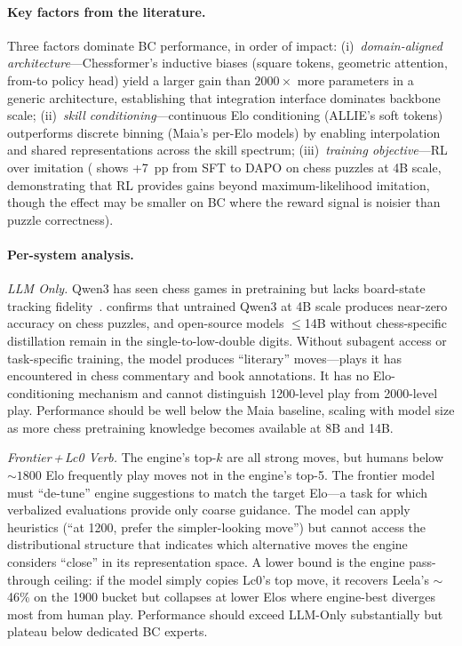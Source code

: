 \paragraph{Key factors from the literature.}
Three factors dominate BC performance, in order of impact:
(i)~\emph{domain-aligned architecture}---Chessformer's inductive biases
(square tokens, geometric attention, from-to policy head) yield a larger
gain than $2000{\times}$ more parameters in a generic architecture,
establishing that integration interface dominates backbone scale;
(ii)~\emph{skill conditioning}---continuous Elo conditioning (ALLIE's soft
tokens) outperforms discrete binning (Maia's per-Elo models) by enabling
interpolation and shared representations across the skill spectrum;
(iii)~\emph{training objective}---RL over imitation
(\cite{XXX_c1} shows +7~pp from SFT to DAPO on chess puzzles at 4B scale,
demonstrating that RL provides gains beyond maximum-likelihood imitation,
though the effect may be smaller on BC where the reward signal is noisier
than puzzle correctness).

\paragraph{Per-system analysis.}

\emph{LLM Only.}
Qwen3 has seen chess games in pretraining but lacks board-state tracking
fidelity~\cite{XXX_chessqa}.
\cite{XXX_c1} confirms that untrained Qwen3 at 4B scale produces near-zero
accuracy on chess puzzles, and open-source models ${\leq}$14B without
chess-specific distillation remain in the single-to-low-double digits.
Without subagent access or task-specific training, the model produces
``literary'' moves---plays it has encountered in chess commentary and
book annotations.
It has no Elo-conditioning mechanism and cannot distinguish 1200-level play
from 2000-level play.
Performance should be well below the Maia baseline, scaling with model size
as more chess pretraining knowledge becomes available at 8B and 14B.

\emph{Frontier\,+\,Lc0 Verb.}
The engine's top-$k$ are all strong moves, but humans below ${\sim}1800$ Elo
frequently play moves not in the engine's top-5.
The frontier model must ``de-tune'' engine suggestions to match the target
Elo---a task for which verbalized evaluations provide only coarse guidance.
The model can apply heuristics (``at 1200, prefer the simpler-looking
move'') but cannot access the distributional structure that indicates which
alternative moves the engine considers ``close'' in its representation space.
A lower bound is the engine pass-through ceiling: if the model simply copies
Lc0's top move, it recovers Leela's ${\sim}$46\% on the 1900 bucket but
collapses at lower Elos where engine-best diverges most from human play.
Performance should exceed LLM-Only substantially but plateau below dedicated
BC experts.

